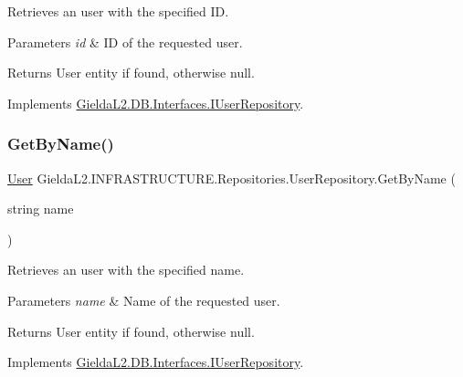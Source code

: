 Retrieves an user with the specified ID. 


\begin{DoxyParams}{Parameters}
{\em id} & ID of the requested user.\\
\hline
\end{DoxyParams}
\begin{DoxyReturn}{Returns}
User entity if found, otherwise null.
\end{DoxyReturn}


Implements \mbox{\hyperlink{interface_gielda_l2_1_1_d_b_1_1_interfaces_1_1_i_user_repository_ae3b2e6d986054c6b336887b4d0d1cfac}{Gielda\+L2.\+D\+B.\+Interfaces.\+I\+User\+Repository}}.

\mbox{\label{class_gielda_l2_1_1_i_n_f_r_a_s_t_r_u_c_t_u_r_e_1_1_repositories_1_1_user_repository_af81e3935a282ab7b2e4d8bdf7b379771}} 
\subsubsection{\texorpdfstring{GetByName()}{GetByName()}}
{\footnotesize\ttfamily \mbox{\hyperlink{class_gielda_l2_1_1_d_b_1_1_entities_1_1_user}{User}} Gielda\+L2.\+I\+N\+F\+R\+A\+S\+T\+R\+U\+C\+T\+U\+R\+E.\+Repositories.\+User\+Repository.\+Get\+By\+Name (\begin{DoxyParamCaption}\item[{string}]{name }\end{DoxyParamCaption})}



Retrieves an user with the specified name. 


\begin{DoxyParams}{Parameters}
{\em name} & Name of the requested user.\\
\hline
\end{DoxyParams}
\begin{DoxyReturn}{Returns}
User entity if found, otherwise null.
\end{DoxyReturn}


Implements \mbox{\hyperlink{interface_gielda_l2_1_1_d_b_1_1_interfaces_1_1_i_user_repository_a6bcf2b383638bfded753b394d1f4de0b}{Gielda\+L2.\+D\+B.\+Interfaces.\+I\+User\+Repository}}.

